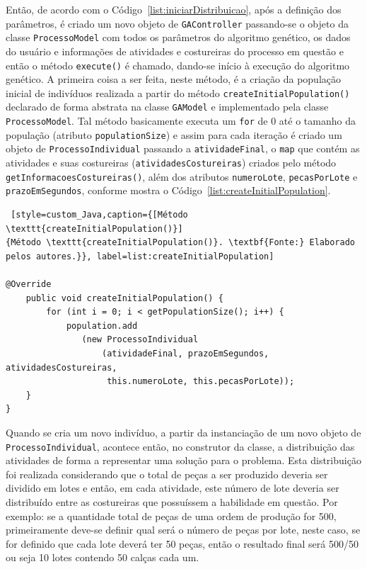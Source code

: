 \par Então, de acordo com o Código~\ref{list:iniciarDistribuicao}, após a definição dos parâmetros, é criado um novo objeto de \texttt{GAController} passando-se o 
objeto da classe \texttt{ProcessoModel} com todos os parâmetros do algoritmo genético, os dados do usuário e 
informações de atividades e costureiras do processo em questão e então  o método \texttt{execute()} é chamado, dando-se início  
à execução do algoritmo genético. A primeira coisa a ser feita, neste método, é a criação da população inicial de indivíduos realizada a partir do método \texttt{createInitialPopulation()} declarado de forma abstrata na classe \texttt{GAModel} e implementado pela classe 
\texttt{ProcessoModel}. Tal método basicamente executa um \texttt{for} de 0 até o tamanho da população (atributo 
\texttt{populationSize}) e assim para cada iteração é criado um objeto de \texttt{ProcessoIndividual} passando a 
\texttt{atividadeFinal}, o \texttt{map} que contém as atividades e suas costureiras (\texttt{atividadesCostureiras}) criados 
pelo método \texttt{getInformacoesCostureiras()}, além dos atributos \texttt{numeroLote}, \texttt{pecasPorLote} e
\texttt{prazoEmSegundos}, conforme mostra o Código~\ref{list:createInitialPopulation}.


\begin{lstlisting} [style=custom_Java,caption={[Método \texttt{createInitialPopulation()}]
{Método \texttt{createInitialPopulation()}. \textbf{Fonte:} Elaborado pelos autores.}}, label=list:createInitialPopulation]

@Override
	public void createInitialPopulation() {
		for (int i = 0; i < getPopulationSize(); i++) {
			population.add
			   (new ProcessoIndividual
			       (atividadeFinal, prazoEmSegundos, atividadesCostureiras,
			        this.numeroLote, this.pecasPorLote));
	}
}

\end{lstlisting}

\par Quando se cria um novo indivíduo, a partir da instanciação de um novo objeto de \texttt{ProcessoIndividual},
acontece então, no construtor da classe, a distribuição das atividades de forma a representar uma solução para o problema.
Esta distribuição foi realizada considerando que o total de
peças a ser produzido deveria ser dividido em lotes e então, em cada atividade,
este número de lote deveria ser distribuído entre as costureiras que possuíssem a habilidade em questão. Por exemplo: se a quantidade total de peças de uma ordem de produção for 500,
primeiramente deve-se definir qual será o número de peças por lote, neste caso, se for definido que cada lote  
deverá ter 50 peças, então o resultado final será 500/50 ou seja 10 lotes contendo 50 calças cada um. 

